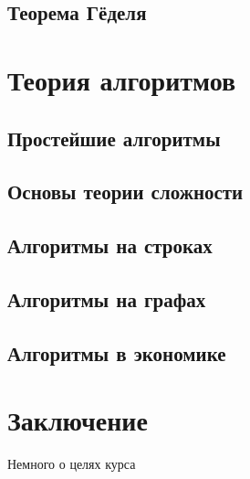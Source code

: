 \documentclass[b5paper,11pt]{book}
\begin{document}
	\section{Теорема Гёделя}
	
	\chapter{Теория алгоритмов}
	
	\section{Простейшие алгоритмы}
	\section{Основы теории сложности}
	\section{Алгоритмы на строках}
	\section{Алгоритмы на графах}
	\section{Алгоритмы в экономике}
	
	
	\chapter*{Заключение}
	Немного о целях курса
	\printbibliography
\end{document}
